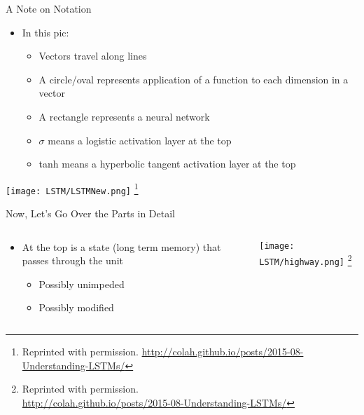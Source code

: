 \documentclass[aspectratio=169]{beamer}
\begin{document}
\begin{frame}{A Note on Notation}
\begin{itemize}
	\item In this pic:
	\begin{itemize}
	\item Vectors travel along lines
	\item A circle/oval represents application of a function to each dimension in a vector
	\item A rectangle represents a neural network
	\item $\sigma$ means a logistic activation layer at the top
	\item tanh means a hyperbolic tangent activation layer at the top
	\end{itemize}
\end{itemize}
\texttt{[image: LSTM/LSTMNew.png]}
\footnote{Reprinted with permission. \url{http://colah.github.io/posts/2015-08-Understanding-LSTMs/}}
\end{frame}
\begin{frame}{Now, Let's Go Over the Parts in Detail}

\begin{columns}
\begin{column}{0.5\textwidth}
        \begin{itemize}
	\item At the top is a state (long term memory) that passes through the unit
	\begin{itemize}
	\item Possibly unimpeded
	\item Possibly modified
	\end{itemize}
\end{itemize}
\end{column}
\begin{column}{0.5\textwidth}
\texttt{[image: LSTM/highway.png]}
\footnote{Reprinted with permission.\\ \hspace{1.7em}\url{http://colah.github.io/posts/2015-08-Understanding-LSTMs/}}
\end{column}
\end{columns}
\end{frame}
\end{document}
